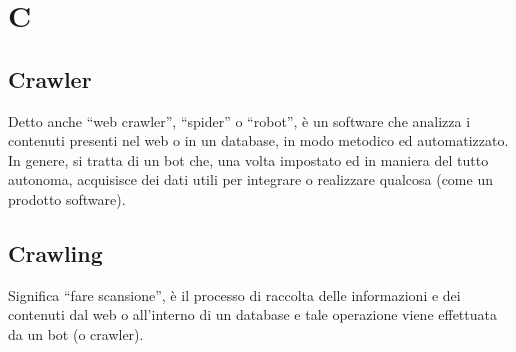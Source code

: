 \section{C}

\subsection{Crawler} Detto anche “web crawler”, “spider” o “robot”, è un software che analizza i contenuti presenti nel web o in un database, in modo metodico ed automatizzato. In genere, si tratta di un bot che, una volta impostato ed in maniera del tutto autonoma, acquisisce dei dati utili per integrare o realizzare qualcosa (come un prodotto software). 

\subsection{Crawling} Significa “fare scansione”, è il processo di raccolta delle informazioni e dei contenuti dal web o all’interno di un database e tale operazione viene effettuata da un bot (o crawler). 

\clearpage 
